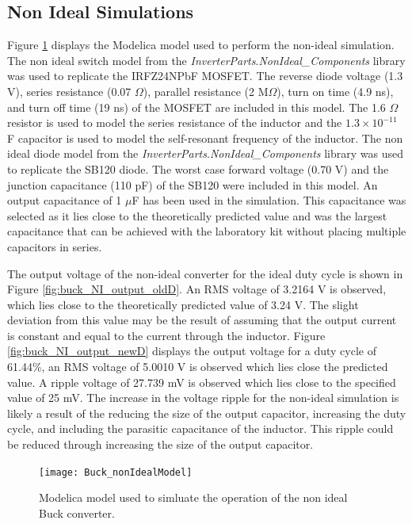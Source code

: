 \documentclass[12pt,twoside]{scrartcl}
\begin{document}
\subsection{Non Ideal Simulations}
Figure \ref{fig:Buck_nonIdealModel} displays the Modelica model used to perform the non-ideal simulation. The non ideal switch model from the \textit{InverterParts}.\textit{NonIdeal\_Components} library was used to replicate the IRFZ24NPbF MOSFET. The reverse diode voltage (1.3 V), series resistance (0.07 $\Omega$), parallel resistance (2 M$\Omega$), turn on time (4.9 ns), and turn off time (19 ns) of the MOSFET are included in this model. The 1.6 $\Omega$ resistor is used to model the series resistance of the inductor and the $1.3\times10^{-11}$ F capacitor is used to model the self-resonant frequency of the inductor. The non ideal diode model from the \textit{InverterParts}.\textit{NonIdeal\_Components} library was used to replicate the SB120 diode. The worst case forward voltage (0.70 V) and the junction capacitance (110 pF) of the SB120 were included in this model. An output capacitance of 1 $\mu$F has been used in the simulation. This capacitance was selected as it lies close to the theoretically predicted value and was the largest capacitance that can be achieved with the laboratory kit without placing multiple capacitors in series. \par
\vspace{5mm}
\noindent The output voltage of the non-ideal converter for the ideal duty cycle is shown in Figure \ref{fig:buck_NI_output_oldD}. An RMS voltage of 3.2164 V is observed, which lies close to the theoretically predicted value of 3.24 V. The slight deviation from this value may be the result of assuming that the output current is constant and equal to the current through the inductor. Figure \ref{fig:buck_NI_output_newD} displays the output voltage for a duty cycle of 61.44\%, an RMS voltage of 5.0010 V is observed which lies close the predicted value. A ripple voltage of 27.739 mV is observed which lies close to the specified value of 25 mV. The increase in the voltage ripple for the non-ideal simulation is likely a result of the reducing the size of the output capacitor, increasing the duty cycle, and including the parasitic capacitance of the inductor. This ripple could be reduced through increasing the size of the output capacitor.\par
\begin{figure}[h]
    \centering
    \texttt{[image: Buck\_nonIdealModel]}
    \caption{Modelica model used to simluate the operation of the non ideal Buck converter.}
    \label{fig:Buck_nonIdealModel}
\end{figure}
\end{document}
